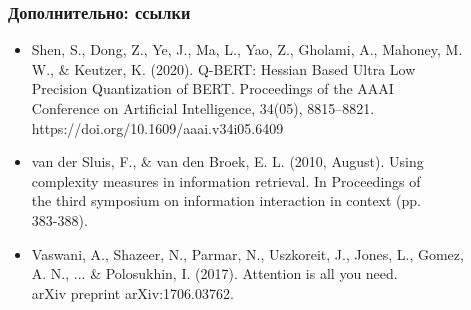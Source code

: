 \documentclass{beamer}
\begin{document}
\begin{frame}[label=supplemental,noframenumbering]
	\frametitle{Дополнительно: ссылки}
	\begin{itemize}
		\item Shen, S., Dong, Z., Ye, J., Ma, L., Yao, Z., Gholami, A., Mahoney, M. \\\hspace{1cm}W., \& Keutzer, K.
		(2020). Q-BERT: Hessian Based Ultra Low \\\hspace{1cm}Precision Quantization of BERT.
		Proceedings of the AAAI \\\hspace{1cm}Conference on Artificial Intelligence, 34(05), 8815–8821.
		\\\hspace{1cm}https://doi.org/10.1609/aaai.v34i05.6409
		\item van der Sluis, F., \& van den Broek, E. L. (2010, August). Using \\\hspace{1cm}complexity measures in
		information retrieval. In Proceedings of \\\hspace{1cm}the third symposium on information
		interaction in context (pp. \\\hspace{1cm}383-388).
		\item Vaswani, A., Shazeer, N., Parmar, N., Uszkoreit, J., Jones, L., Gomez, \\\hspace{1cm}A. N., ... \&
		Polosukhin, I. (2017). Attention is all you need. \\\hspace{1cm}arXiv preprint arXiv:1706.03762.
	\end{itemize}
\end{frame}
\end{document}
